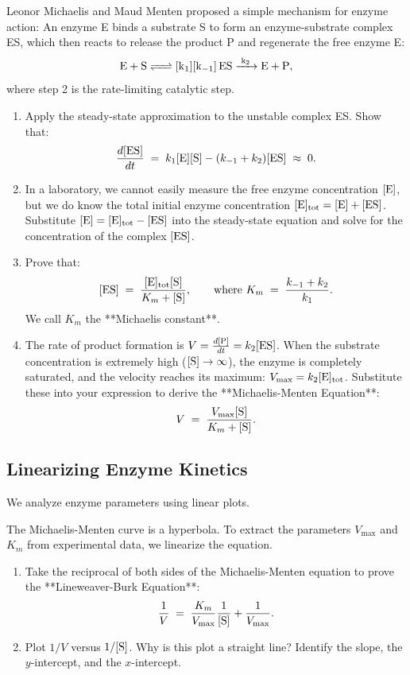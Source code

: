 \documentclass[12pt, a4paper]{book}
\begin{document}
\begin{explobox}
Leonor Michaelis and Maud Menten proposed a simple mechanism for enzyme action:
An enzyme E binds a substrate S to form an enzyme-substrate complex ES, which then reacts to release the product P and regenerate the free enzyme E:
\[
  \ce{E + S <=> [k_1][k_{-1}] ES ->[k_2] E + P},
\]
where step 2 is the rate-limiting catalytic step.
\begin{enumerate}[label=(\alph*), leftmargin=*]
  \item Apply the steady-state approximation to the unstable complex ES. Show that:
  \[
    \frac{d[\ce{ES}]}{dt} \;=\; k_1 [\ce{E}][\ce{S}] - (k_{-1} + k_2)[\ce{ES}] \;\approx\; 0.
  \]
  \item In a laboratory, we cannot easily measure the free enzyme concentration $[\ce{E}]$, but we do know the total initial enzyme concentration $[\ce{E}]_{\text{tot}} = [\ce{E}] + [\ce{ES}]$.
        Substitute $[\ce{E}] = [\ce{E}]_{\text{tot}} - [\ce{ES}]$ into the steady-state equation and solve for the concentration of the complex $[\ce{ES}]$.
  \item Prove that:
  \[
    [\ce{ES}] \;=\; \frac{[\ce{E}]_{\text{tot}} [\ce{S}]}{K_m + [\ce{S}]}, \qquad \text{where } K_m \;=\; \frac{k_{-1} + k_2}{k_1}.
  \]
  We call $K_m$ the **Michaelis constant**.
  \item The rate of product formation is $V = \frac{d[\ce{P}]}{dt} = k_2 [\ce{ES}]$.
        When the substrate concentration is extremely high ($[\ce{S}] \to \infty$), the enzyme is completely saturated, and the velocity reaches its maximum: $V_{\text{max}} = k_2 [\ce{E}]_{\text{tot}}$.
        Substitute these into your expression to derive the **Michaelis-Menten Equation**:
        \[
          V \;=\; \frac{V_{\text{max}} [\ce{S}]}{K_m + [\ce{S}]}.
        \]
\end{enumerate}
\end{explobox}

\subsection{Linearizing Enzyme Kinetics}

We analyze enzyme parameters using linear plots.

\begin{explobox}
The Michaelis-Menten curve is a hyperbola. To extract the parameters $V_{\text{max}}$ and $K_m$ from experimental data, we linearize the equation.
\begin{enumerate}[label=(\alph*), leftmargin=*]
  \item Take the reciprocal of both sides of the Michaelis-Menten equation to prove the **Lineweaver-Burk Equation**:
  \[
    \frac{1}{V} \;=\; \frac{K_m}{V_{\text{max}}} \frac{1}{[\ce{S}]} + \frac{1}{V_{\text{max}}}.
  \]
  \item Plot $1/V$ versus $1/[\ce{S}]$. Why is this plot a straight line? Identify the slope, the $y$-intercept, and the $x$-intercept.
\end{enumerate}
\end{explobox}
\end{document}
